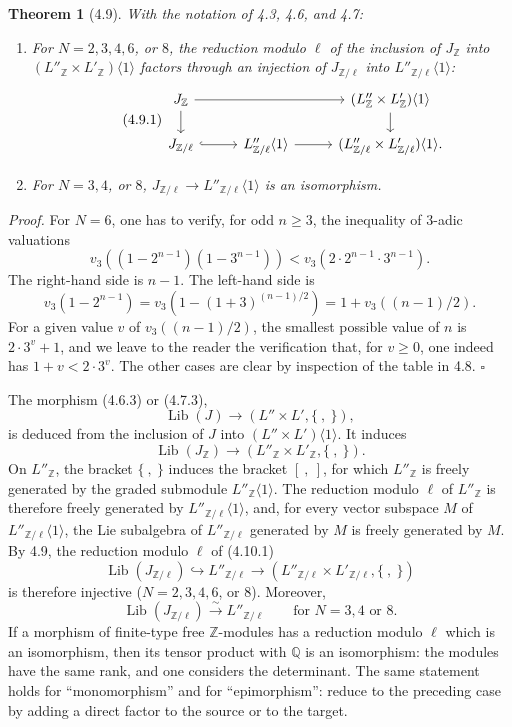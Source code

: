 \documentclass[10pt,a4paper]{article}
\newcommand{\Q}{\mathbb Q}
\newcommand{\Z}{\mathbb Z}
\theoremstyle{deligne}
\newtheorem*{theorem*}{Theorem}
\newenvironment{proofdel}{\textit{Proof.}}{\hfill$\square$}
\newcommand{\heading}[1]{\vspace{0.65em}\noindent{\bfseries #1}\quad}
\begin{document}
\begin{theorem*}[4.9]
With the notation of 4.3, 4.6, and 4.7:
\begin{enumerate}[label=(\roman*)]
\item For \(N=2,3,4,6\), or \(8\), the reduction modulo \(\ell\) of the inclusion of \(J_{\Z}\) into \((L''_{\Z}\times L'_{\Z})\langle1\rangle\) factors through an injection of \(J_{\Z/\ell}\) into \(L''_{\Z/\ell}\langle1\rangle\):
\[
\tag{4.9.1}
\begin{tikzcd}[column sep=2.7em,row sep=1.45em]
J_{\Z} \arrow[rr] \arrow[d] && (L''_{\Z}\times L'_{\Z})\langle1\rangle \arrow[d]\\
J_{\Z/\ell} \arrow[r,hook] & L''_{\Z/\ell}\langle1\rangle \arrow[r] & (L''_{\Z/\ell}\times L'_{\Z/\ell})\langle1\rangle .
\end{tikzcd}
\]
\item For \(N=3,4\), or \(8\), \(J_{\Z/\ell}\to L''_{\Z/\ell}\langle1\rangle\) is an isomorphism.
\end{enumerate}
\end{theorem*}

\begin{proofdel}
For \(N=6\), one has to verify, for odd \(n\ge3\), the inequality of \(3\)-adic valuations
\[
v_3((1-2^{n-1})(1-3^{n-1}))<v_3(2\cdot2^{n-1}\cdot3^{n-1}).
\]
The right-hand side is \(n-1\). The left-hand side is
\[
v_3(1-2^{n-1})=v_3(1-(1+3)^{(n-1)/2})=1+v_3((n-1)/2).
\]
For a given value \(v\) of \(v_3((n-1)/2)\), the smallest possible value of \(n\) is \(2\cdot3^v+1\), and we leave to the reader the verification that, for \(v\ge0\), one indeed has \(1+v<2\cdot3^v\). The other cases are clear by inspection of the table in 4.8.
\end{proofdel}

\heading{4.10.} The morphism (4.6.3) or (4.7.3),
\[
\operatorname{Lib}(J)\longrightarrow(L''\times L',\{\ ,\ \}),
\]
is deduced from the inclusion of \(J\) into \((L''\times L')\langle1\rangle\). It induces
\[
\tag{4.10.1}
\operatorname{Lib}(J_{\Z})\longrightarrow(L''_{\Z}\times L'_{\Z},\{\ ,\ \}).
\]
On \(L''_{\Z}\), the bracket \(\{\ ,\ \}\) induces the bracket \([\ ,\ ]\), for which \(L''_{\Z}\) is freely generated by the graded submodule \(L''_{\Z}\langle1\rangle\). The reduction modulo \(\ell\) of \(L''_{\Z}\) is therefore freely generated by \(L''_{\Z/\ell}\langle1\rangle\), and, for every vector subspace \(M\) of \(L''_{\Z/\ell}\langle1\rangle\), the Lie subalgebra of \(L''_{\Z/\ell}\) generated by \(M\) is freely generated by \(M\). By 4.9, the reduction modulo \(\ell\) of (4.10.1)
\[
\tag{4.10.2}
\operatorname{Lib}(J_{\Z/\ell})\hookrightarrow L''_{\Z/\ell}
\longrightarrow(L''_{\Z/\ell}\times L'_{\Z/\ell},\{\ ,\ \})
\]
is therefore injective (\(N=2,3,4,6\), or \(8\)). Moreover,
\[
\tag{4.10.3}
\operatorname{Lib}(J_{\Z/\ell})\overset{\sim}{\longrightarrow}L''_{\Z/\ell}
\qquad\text{for }N=3,4\text{ or }8.
\]
If a morphism of finite-type free \(\Z\)-modules has a reduction modulo \(\ell\) which is an isomorphism, then its tensor product with \(\Q\) is an isomorphism: the modules have the same rank, and one considers the determinant. The same statement holds for ``monomorphism'' and for ``epimorphism'': reduce to the preceding case by adding a direct factor to the source or to the target.
\end{document}
